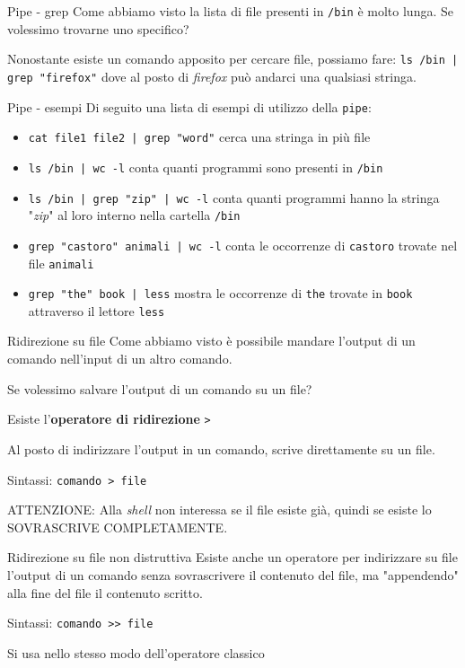 \documentclass{beamer}
\begin{document}
\begin{frame}{Pipe - grep}
  Come abbiamo visto la lista di file presenti in \texttt{/bin} è molto lunga.
  Se volessimo trovarne uno specifico? \bigskip

  Nonostante esiste un comando apposito per cercare file, possiamo fare:
  \texttt{ls /bin | grep "firefox"} dove al posto di \textit{firefox} può 
  andarci una qualsiasi stringa.
\end{frame}

\begin{frame}{Pipe - esempi}
  Di seguito una lista di esempi di utilizzo della \texttt{pipe}:
  \begin{itemize}
    \item \texttt{cat file1 file2 | grep "word"} cerca una stringa in più file
    \item \texttt{ls /bin | wc -l} conta quanti programmi sono presenti in 
      \texttt{/bin}
    \item \texttt{ls /bin | grep "zip" | wc -l} conta quanti programmi hanno
      la stringa "\textit{zip}" al loro interno nella cartella \texttt{/bin}
    \item \texttt{grep "castoro" animali | wc -l} conta le occorrenze di 
      \texttt{castoro} trovate nel file \texttt{animali}
    \item \texttt{grep "the" book | less} mostra le occorrenze di \texttt{the} 
      trovate in \texttt{book} attraverso il lettore \texttt{less}
  \end{itemize}
\end{frame}

\begin{frame}{Ridirezione su file}
  Come abbiamo visto è possibile mandare l'output di un comando nell'input di
  un altro comando.\bigskip

  Se volessimo salvare l'output di un comando su un file?

  Esiste l'\textbf{operatore di ridirezione} \texttt{>}\bigskip

  Al posto di indirizzare l'output in un comando, scrive direttamente su un
  file.\bigskip

  Sintassi: \texttt{comando > file}\bigskip

  ATTENZIONE: Alla \textit{shell} non interessa se il file esiste già, quindi se 
  esiste lo SOVRASCRIVE COMPLETAMENTE.
\end{frame}

\begin{frame}{Ridirezione su file non distruttiva}
  Esiste anche un operatore per indirizzare su file l'output di un comando senza 
  sovrascrivere il contenuto del file, ma "appendendo" alla fine del file il
  contenuto scritto.\bigskip

  Sintassi: \texttt{comando >> file}\bigskip

  Si usa nello stesso modo dell'operatore classico\bigskip
\end{frame}
\end{document}
